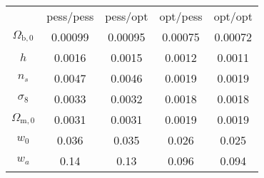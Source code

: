 \begin{table}
\centering
\begin{tabular}{|c|c|c|c|c|}
 & pess/pess & pess/opt & opt/pess & opt/opt \\
$\Omega_{\mathrm{b},0}$ & 0.00099 & 0.00095 & 0.00075 & 0.00072 \\
$h$ & 0.0016 & 0.0015 & 0.0012 & 0.0011 \\
$n_s$ & 0.0047 & 0.0046 & 0.0019 & 0.0019 \\
$\sigma_8$ & 0.0033 & 0.0032 & 0.0018 & 0.0018 \\
$\Omega_{\mathrm{m},0}$ & 0.0031 & 0.0031 & 0.0019 & 0.0019 \\
$w_0$ & 0.036 & 0.035 & 0.026 & 0.025 \\
$w_a$ & 0.14 & 0.13 & 0.096 & 0.094 \\
\end{tabular}
\end{table}
